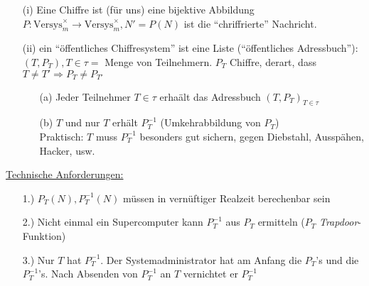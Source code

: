 \documentclass[a4paper,twoside,DIV15,BCOR12mm]{scrbook}
\begin{document}
\begin{definition}
    \begin{itemize}
        \item[(i)] Eine Chiffre ist (für uns) eine bijektive Abbildung $P: \text{Versys}_m^\times \to \text{Versys}_m^\times, N' = P(N)$ ist die "`chriffrierte"' Nachricht.
        \item[(ii)] ein "`öffentliches Chiffresystem"' ist eine Liste ("`öffentliches Adressbuch"'):\\
            $(T, P_T), T \in \tau =$ Menge von Teilnehmern. $P_T$ Chiffre, derart, dass $T \not= T' \Rightarrow P_T \not= P_{T'}$
            \begin{itemize}
                \item[(a)] Jeder Teilnehmer $T \in \tau$ erhaält das Adressbuch $(T, P_T)_{T \in \tau}$
                \item[(b)] $T$ und nur $T$ erhält $P_T^{-1}$ (Umkehrabbildung von $P_T$)\\
                    Praktisch: $T$ muss $P_T^{-1}$ besonders gut sichern, gegen Diebstahl, Ausspähen, Hacker, usw.
            \end{itemize}   \end{itemize}
\end{definition}

\underline{Technische Anforderungen:}\\
\begin{itemize}
    \item[1.)] $P_T(N), P_T^{-1}(N)$ müssen in vernüftiger Realzeit berechenbar sein
    \item[2.)] Nicht einmal ein Supercomputer kann $P_T^{-1}$ aus $P_T$ ermitteln ($P_T$ \emph{Trapdoor}-Funktion)
    \item[3.)] Nur $T$ hat $P_T^{-1}$. Der Systemadministrator hat am Anfang die $P_T$'s und die $P_T^{-1}$'s. Nach Absenden von $P_T^{-1}$ an $T$ vernichtet er $P_T^{-1}$
\end{itemize}
\end{document}
